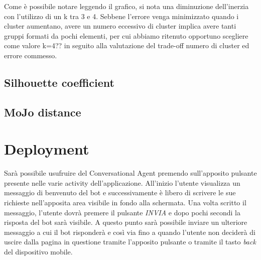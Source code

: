 \documentclass[a4paper, 10pt]{report}
\begin{document}
        Come è possibile notare leggendo il grafico, si nota una diminuzione dell'inerzia con l'utilizzo di un k tra 3 e 4.
        Sebbene l’errore venga minimizzato quando i cluster aumentano, avere un numero eccessivo di cluster implica avere tanti gruppi
        formati da pochi elementi, per cui abbiamo ritenuto opportuno scegliere come valore k=4?? in seguito alla valutazione
        del trade-off numero di cluster ed errore commesso.

        \section{Silhouette coefficient}\label{sec:silhouette-coefficient}


        \section{MoJo distance}\label{sec:mojo-distance}


    \chapter{Deployment}\label{ch:deployment}

        Sarà possibile usufruire del Conversational Agent premendo sull'apposito pulsante presente nelle varie activity dell'applicazione.
        All'inizio l'utente visualizza un messaggio di benvenuto del bot e successivamente è libero di scrivere le sue
        richieste nell'apposita area visibile in fondo alla schermata. Una volta scritto il messaggio, l'utente dovrà premere il pulsante
        \textit{INVIA} e dopo pochi secondi la risposta del bot sarà visibile. A questo punto sarà possibile inviare un ulteriore messaggio a cui
        il bot risponderà e così via fino a quando l'utente non deciderà di uscire dalla pagina in questione tramite l'apposito pulsante
        o tramite il tasto \textit{back} del dispositivo mobile.
\end{document}
